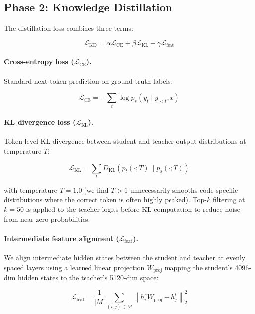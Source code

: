 \documentclass[11pt,a4paper]{article}
\begin{document}
\subsection{Phase 2: Knowledge Distillation}

The distillation loss combines three terms:

\begin{equation}
  \mathcal{L}_{\text{KD}} = \alpha \mathcal{L}_{\text{CE}} + \beta \mathcal{L}_{\text{KL}} + \gamma \mathcal{L}_{\text{feat}}
\end{equation}

\paragraph{Cross-entropy loss ($\mathcal{L}_{\text{CE}}$).}
Standard next-token prediction on ground-truth labels:

\begin{equation}
  \mathcal{L}_{\text{CE}} = -\sum_t \log p_s(y_t \mid y_{<t}, x)
\end{equation}

\paragraph{KL divergence loss ($\mathcal{L}_{\text{KL}}$).}
Token-level KL divergence between student and teacher output distributions at temperature $T$:

\begin{equation}
  \mathcal{L}_{\text{KL}} = \sum_t D_{\text{KL}}\!\left(p_t\!\left(\cdot; T\right) \| p_s\!\left(\cdot; T\right)\right)
\end{equation}

with temperature $T = 1.0$ (we find $T > 1$ unnecessarily smooths code-specific distributions
where the correct token is often highly peaked). Top-$k$ filtering at $k=50$ is applied to
the teacher logits before KL computation to reduce noise from near-zero probabilities.

\paragraph{Intermediate feature alignment ($\mathcal{L}_{\text{feat}}$).}
We align intermediate hidden states between the student and teacher at evenly spaced layers
using a learned linear projection $W_{\text{proj}}$ mapping the student's 4096-dim hidden
states to the teacher's 5120-dim space:

\begin{equation}
  \mathcal{L}_{\text{feat}} = \frac{1}{|M|} \sum_{(i,j) \in M} \left\| h^s_i W_{\text{proj}} - h^t_j \right\|_2^2
\end{equation}
\end{document}
